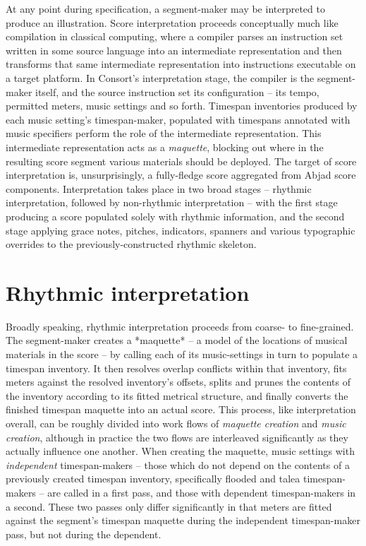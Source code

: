 At any point during specification, a segment-maker may be interpreted to
produce an illustration. Score interpretation proceeds conceptually much like
compilation in classical computing, where a compiler parses an instruction set
written in some source language into an intermediate representation and then
transforms that same intermediate representation into instructions executable
on a target platform. In Consort's interpretation stage, the compiler is the
segment-maker itself, and the source instruction set its configuration -- its
tempo, permitted meters, music settings and so forth. Timespan inventories
produced by each music setting's timespan-maker, populated with timespans
annotated with music specifiers perform the role of the intermediate
representation. This intermediate representation acts as a \emph{maquette},
blocking out where in the resulting score segment various materials should be
deployed. The target of score interpretation is, unsurprisingly, a fully-fledge
score aggregated from Abjad score components. Interpretation takes place in two
broad stages -- rhythmic interpretation, followed by non-rhythmic
interpretation -- with the first stage producing a score populated solely with
rhythmic information, and the second stage applying grace notes, pitches,
indicators, spanners and various typographic overrides to the
previously-constructed rhythmic skeleton.

\section{Rhythmic interpretation}
\label{sec:rhythmic-interpretation}

Broadly speaking, rhythmic interpretation proceeds from coarse- to
fine-grained. The segment-maker creates a *maquette* -- a model of the
locations of musical materials in the score -- by calling each of its
music-settings in turn to populate a timespan inventory. It then resolves
overlap conflicts within that inventory, fits meters against the resolved
inventory's offsets, splits and prunes the contents of the inventory according
to its fitted metrical structure, and finally converts the finished timespan
maquette into an actual score. This process, like interpretation overall, can
be roughly divided into work flows of \emph{maquette creation} and \emph{music
creation}, although in practice the two flows are interleaved significantly as
they actually influence one another. When creating the maquette, music settings
with \emph{independent} timespan-makers -- those which do not depend on the
contents of a previously created timespan inventory, specifically flooded and
talea timespan-makers -- are called in a first pass, and those with {dependent}
timespan-makers in a second. These two passes only differ significantly in that
meters are fitted against the segment's timespan maquette during the
independent timespan-maker pass, but not during the dependent.

